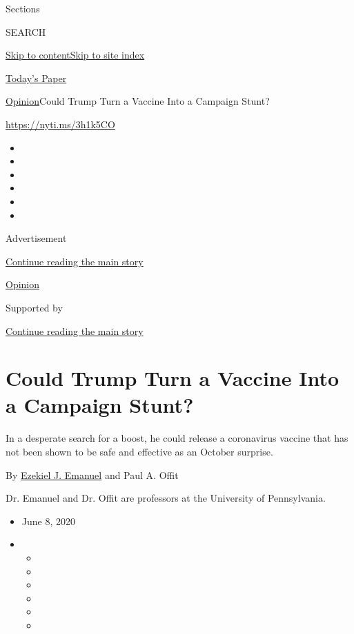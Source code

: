 Sections

SEARCH

\protect\hyperlink{site-content}{Skip to
content}\protect\hyperlink{site-index}{Skip to site index}

\href{https://myaccount.nytimes3xbfgragh.onion/auth/login?response_type=cookie\&client_id=vi}{}

\href{https://www.nytimes3xbfgragh.onion/section/todayspaper}{Today's
Paper}

\href{/section/opinion}{Opinion}\textbar{}Could Trump Turn a Vaccine
Into a Campaign Stunt?

\url{https://nyti.ms/3h1k5CO}

\begin{itemize}
\item
\item
\item
\item
\item
\item
\end{itemize}

Advertisement

\protect\hyperlink{after-top}{Continue reading the main story}

\href{/section/opinion}{Opinion}

Supported by

\protect\hyperlink{after-sponsor}{Continue reading the main story}

\hypertarget{could-trump-turn-a-vaccine-into-a-campaign-stunt}{%
\section{Could Trump Turn a Vaccine Into a Campaign
Stunt?}\label{could-trump-turn-a-vaccine-into-a-campaign-stunt}}

In a desperate search for a boost, he could release a coronavirus
vaccine that has not been shown to be safe and effective as an October
surprise.

By \href{https://hcmg.wharton.upenn.edu/profile/zemanuel/}{Ezekiel J.
Emanuel} and Paul A. Offit

Dr. Emanuel and Dr. Offit are professors at the University of
Pennsylvania.

\begin{itemize}
\item
  June 8, 2020
\item
  \begin{itemize}
  \item
  \item
  \item
  \item
  \item
  \item
  \end{itemize}
\end{itemize}

